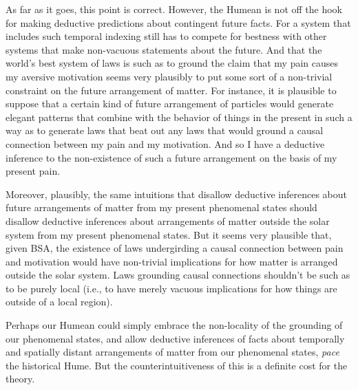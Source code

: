 As far as it goes, this point is correct. However, the Humean is not off the hook for making deductive predictions about contingent
future facts. For a system that includes such temporal indexing still has to compete for bestness with other systems that make
non-vacuous statements about the future. And that the world's best system of laws is such as to ground the claim that my pain causes my
aversive motivation seems very plausibly to put some sort of a non-trivial constraint on the future arrangement of matter. For instance, 
it is plausible to suppose that a certain kind of future arrangement of particles would generate elegant patterns that combine with the 
behavior of things in the present in such a way as to generate laws that beat out any laws that would ground a causal connection between 
my pain and my motivation.  And so I  have a deductive inference to the non-existence of such a future arrangement on the basis of my present
pain.

Moreover, plausibly, the same intuitions that disallow deductive inferences about future arrangements of matter from my present
phenomenal states should disallow deductive inferences about arrangements of matter outside the solar system from my present
phenomenal states. But it seems very plausible that, given BSA, the existence of laws undergirding a causal connection between 
pain and motivation would have non-trivial implications for how matter is arranged outside the solar system. Laws grounding 
causal connections shouldn't be such as to be purely local (i.e., to have merely vacuous implications for how things are outside
of a local region). 

Perhaps our Humean could simply embrace the non-locality of the grounding of our phenomenal states, and allow deductive inferences
of facts about temporally and spatially distant arrangements of matter from our phenomenal states, \textit{pace} the historical Hume.
But the counterintuitiveness of this is a definite cost for the theory.

